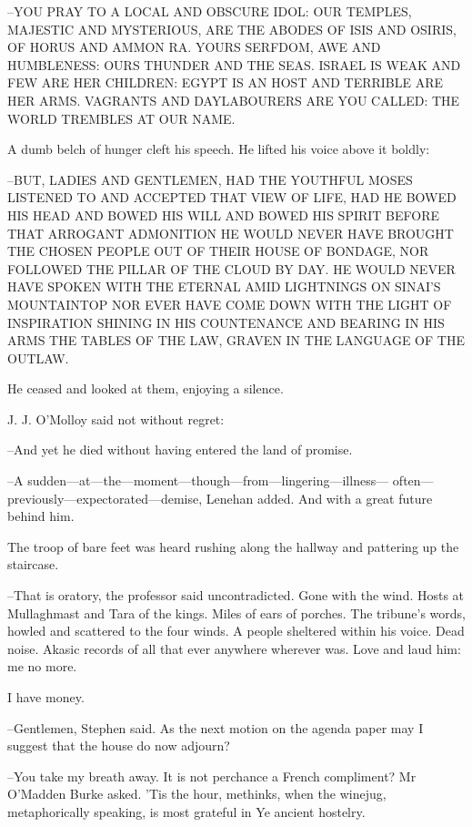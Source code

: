 --YOU PRAY TO A LOCAL AND OBSCURE IDOL: OUR TEMPLES, MAJESTIC AND
MYSTERIOUS, ARE THE ABODES OF ISIS AND OSIRIS, OF HORUS AND AMMON RA.
YOURS SERFDOM, AWE AND HUMBLENESS: OURS THUNDER AND THE SEAS. ISRAEL IS
WEAK AND FEW ARE HER CHILDREN: EGYPT IS AN HOST AND TERRIBLE ARE HER ARMS.
 VAGRANTS AND DAYLABOURERS ARE YOU CALLED: THE WORLD TREMBLES AT OUR NAME.

A dumb belch of hunger cleft his speech. He lifted his voice above it
boldly:

--BUT, LADIES AND GENTLEMEN, HAD THE YOUTHFUL MOSES LISTENED TO AND
ACCEPTED THAT VIEW OF LIFE, HAD HE BOWED HIS HEAD AND BOWED HIS WILL AND
BOWED HIS SPIRIT BEFORE THAT ARROGANT ADMONITION HE WOULD NEVER HAVE
BROUGHT THE CHOSEN PEOPLE OUT OF THEIR HOUSE OF BONDAGE, NOR FOLLOWED THE
PILLAR OF THE CLOUD BY DAY. HE WOULD NEVER HAVE SPOKEN WITH THE ETERNAL
AMID LIGHTNINGS ON SINAI'S MOUNTAINTOP NOR EVER HAVE COME DOWN WITH THE
LIGHT OF INSPIRATION SHINING IN HIS COUNTENANCE AND BEARING IN HIS ARMS
THE TABLES OF THE LAW, GRAVEN IN THE LANGUAGE OF THE OUTLAW.

He ceased and looked at them, enjoying a silence.



J. J. O'Molloy said not without regret:

--And yet he died without having entered the land of promise.

--A sudden---at---the---moment---though---from---lingering---illness---%
often---previously---expectorated---demise, Lenehan added. And with a
great future behind him.

The troop of bare feet was heard rushing along the hallway and
pattering up the staircase.

--That is oratory, the professor said uncontradicted. Gone with the wind.
Hosts at Mullaghmast and Tara of the kings. Miles of ears of porches.
The tribune's words, howled and scattered to the four winds. A people
sheltered within his voice. Dead noise. Akasic records of all that ever
anywhere wherever was. Love and laud him: me no more.

I have money.

--Gentlemen, Stephen said. As the next motion on the agenda paper may I
suggest that the house do now adjourn?

--You take my breath away. It is not perchance a French compliment? Mr
O'Madden Burke asked. 'Tis the hour, methinks, when the winejug,
metaphorically speaking, is most grateful in Ye ancient hostelry.

